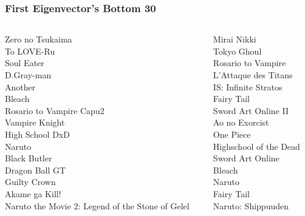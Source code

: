 \documentclass[handout]{beamer}
\begin{document}
\begin{frame}
    \frametitle{First Eigenvector's Bottom 30}
    \begin{columns}
    \begin{column}{0.5\textwidth}
                                   Zero no Tsukaima\\
                                         To LOVE-Ru\\
                                         Soul Eater\\
                                         D.Gray-man\\
                                            Another\\
                                             Bleach\\
                           Rosario to Vampire Capu2\\
                                     Vampire Knight\\
                                    High School DxD\\
                                             Naruto\\
                                       Black Butler\\
                                     Dragon Ball GT\\
                                       Guilty Crown\\
                                     Akame ga Kill!\\
   Naruto the Movie 2: Legend of the Stone of Gelel\\
    \end{column}
    \begin{column}{0.5\textwidth}
                                        Mirai Nikki\\
                                        Tokyo Ghoul\\
                                 Rosario to Vampire\\
                               L'Attaque des Titans\\
                               IS: Infinite Stratos\\
                                         Fairy Tail\\
                                Sword Art Online II\\
                                     Ao no Exorcist\\
                                          One Piece\\
                             Highschool of the Dead\\
                                   Sword Art Online\\
                                             Bleach\\
                                             Naruto\\
                                         Fairy Tail\\
                                 Naruto: Shippuuden\\
    \end{column}
    \end{columns}
\end{frame}
\end{document}
